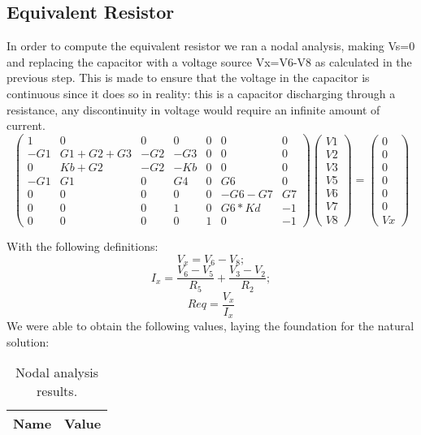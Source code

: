 \subsection{Equivalent Resistor}
In order to compute the equivalent resistor we ran a nodal analysis, making Vs=0 and replacing the capacitor with a voltage source Vx=V6-V8 as calculated in the previous step. This is made to ensure that the voltage in the capacitor is continuous since it does so in reality: this is a capacitor discharging through a resistance, any discontinuity in voltage would require an infinite amount of current. 
\begin{equation}
\begin{pmatrix}
1 & 0 & 0 & 0 & 0 & 0 & 0\\
-G1 & G1+G2+G3 & -G2 & -G3 & 0 & 0 & 0\\
0 & Kb+G2 & -G2 & -Kb & 0 & 0 & 0\\
-G1 & G1 & 0 & G4 & 0 & G6 & 0\\
0 & 0 & 0 & 0 & 0 & -G6-G7 & G7\\
0 & 0 & 0 & 1 & 0 & G6*Kd & -1\\
0 & 0 & 0 & 0 & 1 & 0 & -1
\end{pmatrix}
\begin{pmatrix}
V1\\
V2\\
V3\\
V5\\
V6\\
V7\\
V8
\end{pmatrix}
=
\begin{pmatrix}
0\\
0\\
0\\
0\\
0\\
0\\
Vx
\end{pmatrix}
\end{equation}

With the following definitions:
\begin{equation}
V_x=V_6-V_8;
\end{equation}
\begin{equation}
I_x=\frac {V_6-V_5}{R_5}+\frac {V_3-V_2}{R_2};
\end{equation}
\begin{equation}
Req=\frac {V_x}{I_x}
\end{equation}
We were able to obtain the following values, laying the foundation for the natural solution:
\begin{table}[h]
  \centering
  \begin{tabular}{|l|r|}
    \hline    
    {\bf Name} & {\bf Value} \\ \hline
     
  \end{tabular}
  \caption{Nodal analysis results.}
  \label{tab:nodal}
\end{table}
